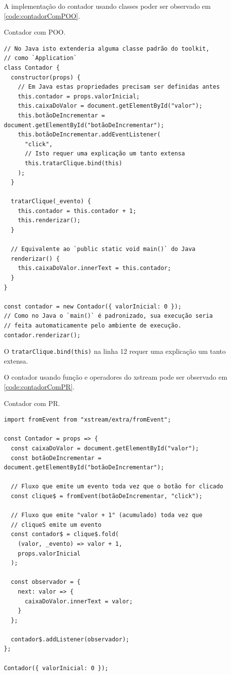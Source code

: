 A implementação do contador usando classes poder ser observado em
\ref{code:contadorComPOO}.

\begin{listing}[htbp]
\caption{\label{code:contadorComPOO}Contador com POO.}
\begin{verbatim}
// No Java isto extenderia alguma classe padrão do toolkit,
// como `Application`
class Contador {
  constructor(props) {
    // Em Java estas propriedades precisam ser definidas antes
    this.contador = props.valorInicial;
    this.caixaDoValor = document.getElementById("valor");
    this.botãoDeIncrementar = document.getElementById("botãoDeIncrementar");
    this.botãoDeIncrementar.addEventListener(
      "click",
      // Isto requer uma explicação um tanto extensa
      this.tratarClique.bind(this)
    );
  }

  tratarClique(_evento) {
    this.contador = this.contador + 1;
    this.renderizar();
  }

  // Equivalente ao `public static void main()` do Java
  renderizar() {
    this.caixaDoValor.innerText = this.contador;
  }
}

const contador = new Contador({ valorInicial: 0 });
// Como no Java o `main()` é padronizado, sua execução seria
// feita automaticamente pelo ambiente de execução.
contador.renderizar();
\end{verbatim}
\end{listing}

O \texttt{tratarClique.bind(this)} na linha 12 requer uma explicação um tanto
extensa.

O contador usando função e operadores do xstream pode ser observado em
\ref{code:contadorComPR}.

\begin{listing}[htbp]
\caption{\label{code:contadorComPR}Contador com PR.}
\begin{verbatim}
import fromEvent from "xstream/extra/fromEvent";

const Contador = props => {
  const caixaDoValor = document.getElementById("valor");
  const botãoDeIncrementar = document.getElementById("botãoDeIncrementar");

  // Fluxo que emite um evento toda vez que o botão for clicado
  const clique$ = fromEvent(botãoDeIncrementar, "click");

  // Fluxo que emite "valor + 1" (acumulado) toda vez que
  // cliqueS emite um evento
  const contador$ = clique$.fold(
    (valor, _evento) => valor + 1,
    props.valorInicial
  );

  const observador = {
    next: valor => {
      caixaDoValor.innerText = valor;
    }
  };

  contador$.addListener(observador);
};

Contador({ valorInicial: 0 });
\end{verbatim}
\end{listing}

